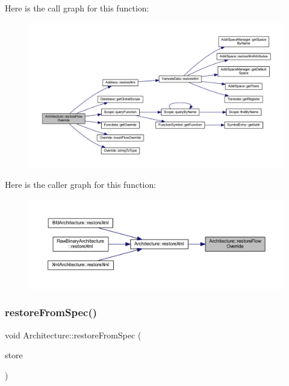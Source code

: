 Here is the call graph for this function\+:
\nopagebreak
\begin{figure}[H]
\begin{center}
\leavevmode
\includegraphics[width=350pt]{class_architecture_a4181297a704049ca50c3fc3d233bc0e4_cgraph}
\end{center}
\end{figure}
Here is the caller graph for this function\+:
\nopagebreak
\begin{figure}[H]
\begin{center}
\leavevmode
\includegraphics[width=350pt]{class_architecture_a4181297a704049ca50c3fc3d233bc0e4_icgraph}
\end{center}
\end{figure}
\mbox{\label{class_architecture_aed18df408eb73d0735966c68b44e413b}} 
\subsubsection{\texorpdfstring{restoreFromSpec()}{restoreFromSpec()}}
{\footnotesize\ttfamily void Architecture\+::restore\+From\+Spec (\begin{DoxyParamCaption}\item[{\mbox{\hyperlink{class_document_storage}{Document\+Storage}} \&}]{store }\end{DoxyParamCaption})\hspace{0.3cm}{\ttfamily [protected]}}



